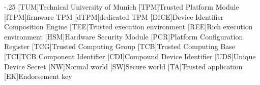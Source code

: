 \documentclass[headsepline,footsepline,footinclude=false,fontsize=11pt,paper=a4,listof=totoc,bibliography=totoc,BCOR=12mm,DIV=12]{scrbook} %
\begin{document}


\frontmatter{}





\tableofcontents{}

\mainmatter{}

%








\appendix{}


\begin{acronym}
	\itemsep-.25\baselineskip
	[TUM]{Technical University of Munich}
	[TPM]{Trusted Platform Module}
	[fTPM]{firmware TPM}
	[dTPM]{dedicated TPM}
	[DICE]{Device Identifier Composition Engine}
	[TEE]{Trusted execution environment}
	[REE]{Rich execution environment}
	[HSM]{Hardware Security Module}
	[PCR]{Platform Configuration Register}
	[TCG]{Trusted Computing Group}
	[TCB]{Trusted Computing Base}
	[TCI]{TCB Component Identifier}
	[CDI]{Compound Device Identifier}
	[UDS]{Unique Device Secret}
	[NW]{Normal world}
	[SW]{Secure world}
	[TA]{Trusted application}
	[EK]{Endorsement key}
\end{acronym}

\listoffigures{}
\listoftables{}
\printbibliography{}
\end{document}
